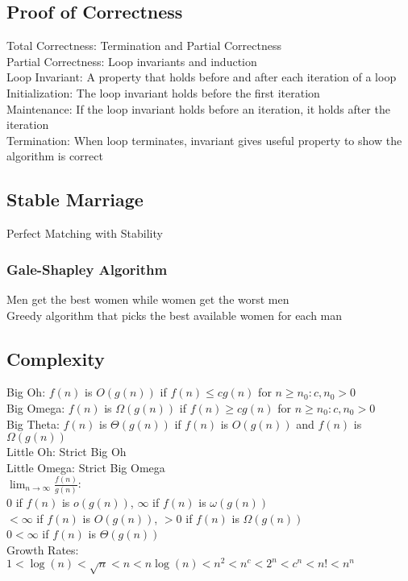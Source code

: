 \documentclass{article}
\author{Ian Chen}
\date{\today}
\begin{document}
    \begin{multicols*}{2}
        \subsection*{Proof of Correctness}
        Total Correctness: Termination and Partial Correctness\\
        Partial Correctness: Loop invariants and induction\\
        Loop Invariant: A property that holds before and after each iteration of a loop\\
        Initialization: The loop invariant holds before the first iteration\\
        Maintenance: If the loop invariant holds before an iteration, it holds after the iteration\\
        Termination: When loop terminates, invariant gives useful property to show the algorithm is
        correct
        \subsection*{Stable Marriage}
        Perfect Matching with Stability
        \subsubsection*{Gale-Shapley Algorithm}
        Men get the best women while women get the worst men\\
        Greedy algorithm that picks the best available women for each man
        \subsection*{Complexity}
        Big Oh: $f(n)$ is $O(g(n))$ if $f(n) \leq cg(n)$ for $n \geq n_0 : c, n_0 > 0$\\
        Big Omega: $f(n)$ is $\Omega(g(n))$ if $f(n) \geq cg(n)$ for $n \geq n_0 : c, n_0 > 0$\\
        Big Theta: $f(n)$ is $\Theta(g(n))$ if $f(n)$ is $O(g(n))$ and $f(n)$ is $\Omega(g(n))$\\
        Little Oh: Strict Big Oh\\
        Little Omega: Strict Big Omega\\
        $\lim_{n\to\infty}\frac{f(n)}{g(n)}$:\\
        0 if $f(n)$ is $o(g(n))$, $\infty$ if $f(n)$ is $\omega(g(n))$\\
        $< \infty$ if $f(n)$ is $O(g(n))$, $> 0$ if $f(n)$ is $\Omega(g(n))$\\
        $0 < \infty$ if $f(n)$ is $\Theta(g(n))$\\
        Growth Rates: $1 < \log(n) < \sqrt{n} < n < n\log(n) < n^2 < n^c < 2^n < c^n < n! < n^n$

\end{multicols*}
\end{document}
